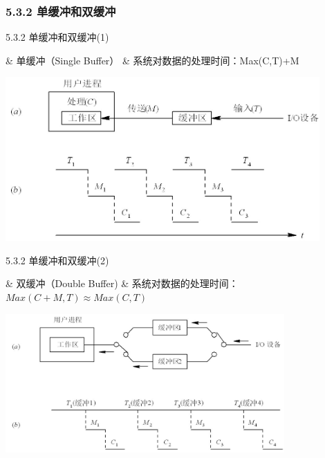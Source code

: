 \subsubsection{5.3.2 单缓冲和双缓冲}
\begin{frame}[fragile]{5.3.2 单缓冲和双缓冲(1)}
  \begin{easylist}
    & 单缓冲（Single Buffer）
    & 系统对数据的处理时间：Max(C,T)+M
  \end{easylist}
  \begin{center}
    \includegraphics[width=0.9\textwidth]{figure/dev-buffer-single.jpg}
  \end{center}
\end{frame}

\begin{frame}[fragile]{5.3.2 单缓冲和双缓冲(2)}
  \begin{easylist}
    & 双缓冲（Double Buffer)
    & 系统对数据的处理时间：$Max(C+M,T) \approx Max(C, T)$
  \end{easylist}
  \begin{center}
    \includegraphics[width=0.8\textwidth]{figure/dev-buffer-double.jpg}
  \end{center}
\end{frame}

